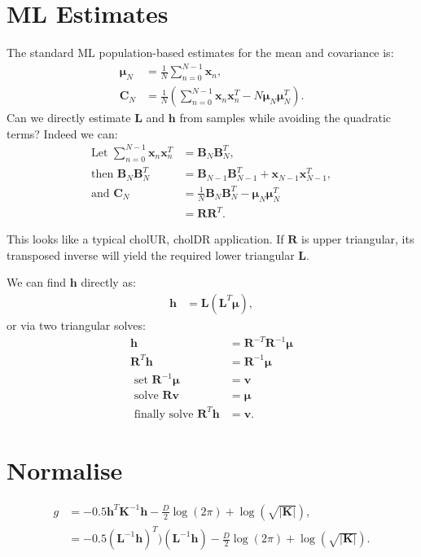 \documentclass[oneside,english]{scrbook}
\begin{document}
\section{ML Estimates}
The standard ML population-based estimates for the mean and covariance is:
\begin{align*}
  \bm{\mu}_N &= \frac{1}{N}\sum_{n=0}^{N-1}\bm{x}_n,\\
  \bm{C}_N &= \frac{1}{N}\left(\sum_{n=0}^{N-1}\bm{x}_n\bm{x}^T_n - N \bm{\mu}_N\bm{\mu}_N^T\right).
\end{align*}
Can we directly estimate $\bm{L}$ and $\bm{h}$ from samples while
avoiding the quadratic terms? Indeed we can:
\begin{align*}
  \text{Let } \sum_{n=0}^{N-1}\bm{x}_n\bm{x}^T_n &= \bm{B}_N\bm{B}_N^T,\\
  \text{then } \bm{B}_N\bm{B}_N^T &= \bm{B}_{N-1}\bm{B}_{N-1}^T + \bm{x}_{N-1}\bm{x}^T_{N-1},\\
  \text{and } \bm{C}_N &= \frac{1}{N}\bm{B}_{N}\bm{B}_{N}^T - \bm{\mu}_N\bm{\mu}_N^T \\
                       &= \bm{R} \bm{R}^T.
\end{align*}

This looks like a typical cholUR, cholDR application. If $\bm{R}$ is
upper triangular, its transposed inverse will yield the required lower
triangular $\bm{L}$.

We can find $\bm{h}$ directly as:
\begin{align*}
  \bm{h} &= \bm{L}(\bm{L}^{T}\bm{\mu}),
\end{align*}
or via two triangular solves:
\begin{align*}
  \bm{h} &= \bm{R}^{-T}\bm{R}^{-1}\bm{\mu}\\
  \bm{R}^{T}\bm{h} &= \bm{R}^{-1}\bm{\mu}\\
  \text{ set } \bm{R}^{-1}\bm{\mu} &= \bm{v} \\
  \text{ solve } \bm{R}\bm{v} &= \bm{\mu}\\
  \text{ finally solve } \bm{R}^{T}\bm{h} &= \bm{v}.
\end{align*}

\section{Normalise}
\begin{align*}
  g &= -0.5 \bm{h}^T\bm{K}^{-1}\bm{h} - \frac{D}{2}\log(2\pi) + \log(\sqrt{|\bm{K}|}),\\
  &= -0.5 (\bm{L}^{-1}\bm{h})^T)(\bm{L}^{-1}\bm{h}) - \frac{D}{2}\log(2\pi) + \log(\sqrt{|\bm{K}|}).
\end{align*}
\end{document}
